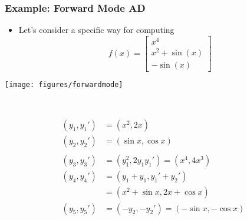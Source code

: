 \documentclass[usenames,dvipsnames]{beamer}
\begin{document}
\begin{frame}
	\frametitle{Example: Forward Mode AD}
	\begin{itemize}
	\item 	Let's consider a specific way for computing 
	\begin{equation*}
		f(x) = \begin{bmatrix}
			x^4\\
			x^2 + \sin(x) \\
			-\sin(x)
		\end{bmatrix}
	\end{equation*}
	\end{itemize}

	
	
	\begin{minipage}[b]{0.45\textwidth}
	\texttt{[image: figures/forwardmode]}
\end{minipage}~
\begin{minipage}[b]{0.45\textwidth}
  \begin{align*}
(y_1, y_1')& = (x^2, 2x) \\
(y_2, y_2') &= (\sin x, \cos x) \\
\\
(y_3, y_3') &= (y_1^2, 2y_1y_1') = (x^4, 4x^3)\\
(y_4, y_4') &= (y_1+y_1, y_1'+y_2') \\
&= (x^2+\sin x, 2x+\cos x) \\
(y_5, y_5')& = (-y_2, -y_2') = (-\sin x, -\cos x)
 	\end{align*}
\end{minipage}
\end{frame}
\end{document}
